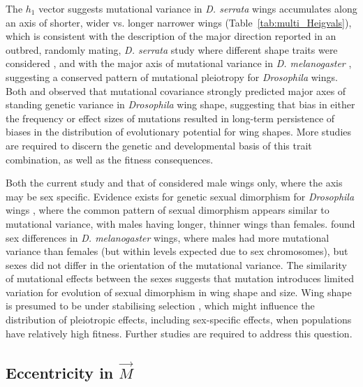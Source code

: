 The $h_1$ vector suggests mutational variance in \textit{D. serrata} wings accumulates along an axis of shorter, wider vs. longer narrower wings (Table~\ref{tab:multi_Heigvals}), which is consistent with the description of the major direction reported in an outbred, randomly mating, \textit{D. serrata} study where different shape traits were considered \citep{Duga21}, and with the major axis of mutational variance in \textit{D. melanogaster} \citep{Houl17}, suggesting a conserved pattern of mutational pleiotropy for \textit{Drosophila} wings. Both \citet{Duga21} and \citet{Houl17} observed that mutational covariance strongly predicted major axes of standing genetic variance in \textit{Drosophila} wing shape, suggesting that bias in either the frequency or effect sizes of mutations resulted in long-term persistence of biases in the distribution of evolutionary potential for wing shapes. More studies are required to discern the genetic and developmental basis of this trait combination, as well as the fitness consequences. \par

Both the current study and that of \citet{Duga21} considered male wings only, where the axis may be sex specific. Evidence exists for genetic sexual dimorphism for \textit{Drosophila} wings \citep{Szte19,Szte21}, where the common pattern of sexual dimorphism appears similar to mutational variance, with males having longer, thinner wings than females. \citet{Houl13} found sex differences in \textit{D. melanogaster} wings, where males had more mutational variance than females (but within levels expected due to sex chromosomes), but sexes did not differ in the orientation of the mutational variance. The similarity of mutational effects between the sexes suggests that mutation introduces limited variation for evolution of sexual dimorphism in wing shape and size. Wing shape is presumed to be under stabilising selection \citep{Houl17, Duga21}, which might influence the distribution of pleiotropic effects, including sex-specific effects, when populations have relatively high fitness. Further studies are required to address this question. \par

\subsection{Eccentricity in $\vec{M}$}

